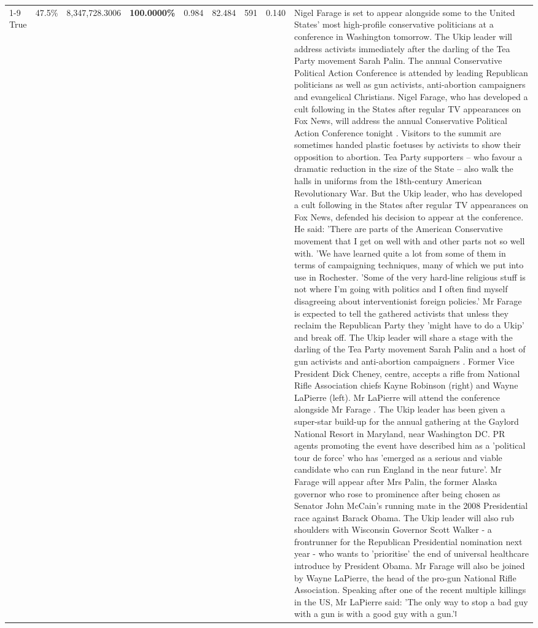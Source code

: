 \begin{table}[H]
\begin{tabular}{lllrlllll}
\cline{1-9} \cline{2-9}
True & 47.5\% & 8,347,728.3006 & \bfseries \color{red} 100.0000\% & 0.984 & 82.484 & 591 & 0.140 & Nigel Farage is set to appear alongside some to the United States' most high-profile conservative politicians at a conference in Washington tomorrow. The Ukip leader will address activists immediately after the darling of the Tea Party movement Sarah Palin. The annual Conservative Political Action Conference is attended by leading Republican politicians as well as gun activists, anti-abortion campaigners and evangelical Christians. Nigel Farage, who has developed a cult following in the States after regular TV appearances on Fox News, will address the annual Conservative Political Action Conference tonight . Visitors to the summit are sometimes handed plastic foetuses by activists to show their opposition to abortion. Tea Party supporters – who favour a dramatic reduction in the size of the State – also walk the halls in uniforms from the 18th-century American Revolutionary War. But the Ukip leader, who has developed a cult following in the States after regular TV appearances on Fox News, defended his decision to appear at the conference. He said: 'There are parts of the American Conservative movement that I get on well with and other parts not so well with. 'We have learned quite a lot from some of them in terms of campaigning techniques, many of which we put into use in Rochester. 'Some of the very hard-line religious stuff is not where I'm going with politics and I often find myself disagreeing about interventionist foreign policies.' Mr Farage is expected to tell the gathered activists that unless they reclaim the Republican Party they 'might have to do a Ukip' and break off. The Ukip leader will share a stage with the darling of the Tea Party movement Sarah Palin and a host of gun activists and anti-abortion campaigners . Former Vice President Dick Cheney, centre, accepts a rifle from National Rifle Association chiefs Kayne Robinson (right) and Wayne LaPierre (left). Mr LaPierre will attend the conference alongside Mr Farage . The Ukip leader has been given a super-star build-up for the annual gathering at the Gaylord National Resort in Maryland, near Washington DC. PR agents promoting the event have described him as a 'political tour de force' who has 'emerged as a serious and viable candidate who can run England in the near future'. Mr Farage will appear after Mrs Palin, the former Alaska governor who rose to prominence after being chosen as Senator John McCain's running mate in the 2008 Presidential race against Barack Obama. The Ukip leader will also rub shoulders with Wisconsin Governor Scott Walker - a frontrunner for the Republican Presidential nomination next year - who wants to 'prioritise' the end of universal healthcare introduce by President Obama. Mr Farage will also be joined by Wayne LaPierre, the head of the pro-gun National Rifle Association. Speaking after one of the recent multiple killings in the US, Mr LaPierre said: 'The only way to stop a bad guy with a gun is with a good guy with a gun.'፧ \\

\end{tabular}
\end{table}
